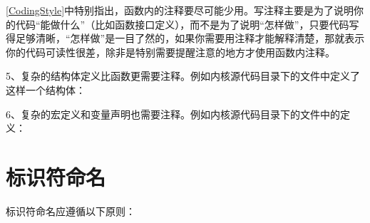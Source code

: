 

\hyperlink{db.bi01.bibli.codingstyle}{[CodingStyle]}中特别指出，函数内的注释要尽可能少用。写注释主要是为了说明你的代码“能做什么”（比如函数接口定义），而不是为了说明“怎样做”，只要代码写得足够清晰，“怎样做”是一目了然的，如果你需要用注释才能解释清楚，那就表示你的代码可读性很差，除非是特别需要提醒注意的地方才使用函数内注释。



5、复杂的结构体定义比函数更需要注释。例如内核源代码目录下的文件中定义了这样一个结构体：




6、复杂的宏定义和变量声明也需要注释。例如内核源代码目录下的文件中的定义：






\section{标识符命名}
%
标识符命名应遵循以下原则：


